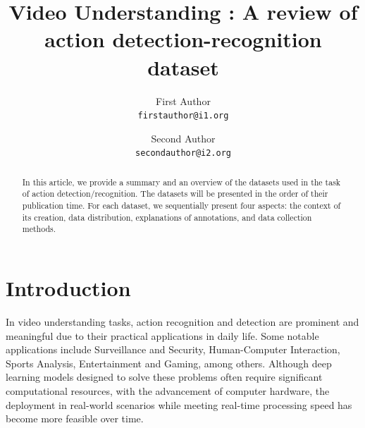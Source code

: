 \documentclass[10pt,onecolumn,letterpaper]{article}
\begin{document}
	
	\title{Video Understanding : A review of action detection-recognition dataset}
	
	\author{First Author\\
		{\tt\small firstauthor@i1.org}
	\and
	Second Author\\
	{\tt\small secondauthor@i2.org}
}
\maketitle

\begin{abstract}
	In this article, we provide a summary and an overview of the datasets used in
	the task of action detection/recognition. The datasets will be presented in the
	order of their publication time. For each dataset, we sequentially present four
	aspects: the context of its creation, data distribution, explanations of
	annotations, and data collection methods. \\
\end{abstract}

\section{Introduction}
In video understanding tasks, action recognition and detection are prominent and
meaningful due to their practical applications in daily life. Some notable
applications include Surveillance and Security, Human-Computer Interaction,
Sports Analysis, Entertainment and Gaming, among others. Although deep learning
models designed to solve these problems often require significant computational
resources, with the advancement of computer hardware, the deployment in
real-world scenarios while meeting real-time processing speed has become more
feasible over time.
\end{document}
